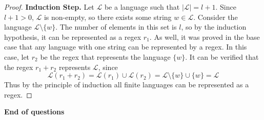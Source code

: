 \documentclass[11pt]{article}
\begin{document}
\begin{enumerate}[label=\textbf{Q\arabic*.}]
\begin{proof}
	\textbf{Induction Step.} Let \(\mathcal{L}\) be a language such that \(|\mathcal{L}| = l + 1\). Since \(l+1 > 0\), \(\mathcal{L}\) is non-empty, so there exists some string \(w \in \mathcal{L}\). Consider the language \(\mathcal{L} \setminus \{w\}\). The number of elements in this set is \(l\), so by the induction hypothesis, it can be represented as a regex \(r_1\). As well, it was proved in the base case that any language with one string can be represented by a regex. In this case, let \(r_2\) be the regex that represents the language \(\{w\}\). It can be verified that the regex \(r_1 + r_2\) represents \(\mathcal{L}\), since
	\[
		\mathcal{L} (r_1 + r_2) = \mathcal{L} (r_1) \cup \mathcal{L} (r_2) = \mathcal{L} \setminus \{w\} \cup \{w\} = \mathcal{L}
	\]
	Thus by the principle of induction all finite languages can be represented as a regex.

\end{proof}


	\end{enumerate}

\vspace{1cm}

 \textbf{End of questions}
\end{document}
